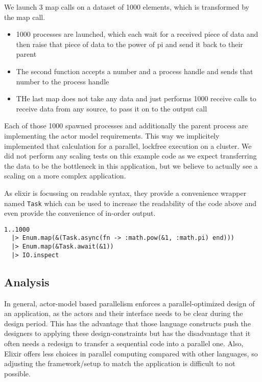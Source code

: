 \documentclass[]{paper}
\begin{document}
We launch 3 map calls on a dataset of 1000 elements, which is transformed by the map call.
\begin{itemize}
  \item 1000 processes are launched, which each wait for a received piece of data and then raise that piece of data to the power of pi and send it back to their parent
  \item The second function accepts a number and a process handle and sends that number to the process handle
  \item THe last map does not take any data and just performs 1000 receive calls to receive data from any source, to pass it on to the output call
\end{itemize}

Each of those 1000 spawned processes and additionally the parent process are implementing the actor model requirements. This way we implicitely implemented that calculation for a parallel, lockfree execution on a cluster. We did not perform any scaling tests on this example code as we expect transferring the data to be the bottleneck in this application, but we believe to actually see a scaling on a more complex application.

As elixir is focussing on readable syntax, they provide a convenience wrapper named \texttt{Task} which can be used to increase the readability of the code above and even provide the convenience of in-order output.

\begin{lstlisting}
1..1000
  |> Enum.map(&(Task.async(fn -> :math.pow(&1, :math.pi) end)))
  |> Enum.map(&Task.await(&1))
  |> IO.inspect
\end{lstlisting}

\subsection{Analysis}

In general, actor-model based parallelism enforces a parallel-optimized design of an application, as the actors and their interface needs to be clear during the design period. This has the advantage that those language constructs push the designers to applying these design-constraints but has the disadvantage that it often needs a redesign to transfer a sequential code into a parallel one. Also, Elixir offers less choices in parallel computing compared with other languages, so adjusting the framework/setup to match the application is difficult to not possible. 
\end{document}
